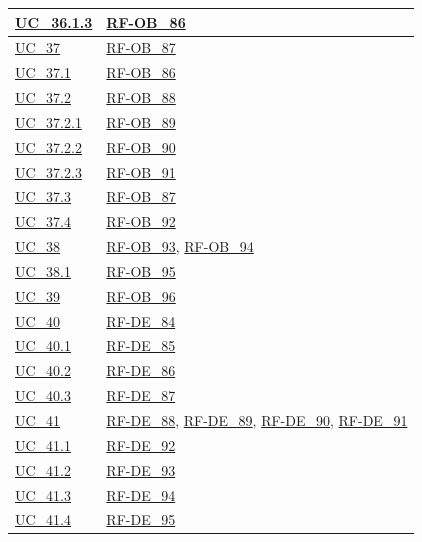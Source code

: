\begin{longtable}{|
        >{\raggedright\arraybackslash}p{} |
        >{\raggedright\arraybackslash}p{} |
    }
    \hline
    \hyperref[uc_36.1.3]{UC\_36.1.3} & \hyperlink{rf-ob_86}{RF-OB\_86} \\
    \hline
    \hyperref[uc_37]{UC\_37} & \hyperlink{rf-ob_87}{RF-OB\_87} \\
    \hline
    \hyperref[uc_37.1]{UC\_37.1} & \hyperlink{rf-ob_86}{RF-OB\_86} \\
    \hline
    \hyperref[uc_37.2]{UC\_37.2} & \hyperlink{rf-ob_88}{RF-OB\_88} \\
    \hline
    \hyperref[uc_37.2.1]{UC\_37.2.1} & \hyperlink{rf-ob_89}{RF-OB\_89} \\
    \hline
    \hyperref[uc_37.2.2]{UC\_37.2.2} & \hyperlink{rf-ob_90}{RF-OB\_90} \\
    \hline
    \hyperref[uc_37.2.3]{UC\_37.2.3} & \hyperlink{rf-ob_91}{RF-OB\_91} \\
    \hline
    \hyperref[uc_37.3]{UC\_37.3} & \hyperlink{rf-ob_87}{RF-OB\_87} \\
    \hline
    \hyperref[uc_37.4]{UC\_37.4} & \hyperlink{rf-ob_92}{RF-OB\_92} \\
    \hline
    \hyperref[uc_38]{UC\_38} & \hyperlink{rf-ob_93}{RF-OB\_93}, \hyperlink{rf-ob_94}{RF-OB\_94} \\
    \hline
    \hyperref[uc_38.1]{UC\_38.1} & \hyperlink{rf-ob_95}{RF-OB\_95} \\
    \hline
    \hyperref[uc_39]{UC\_39} & \hyperlink{rf-ob_96}{RF-OB\_96} \\
    \hline
    \hyperref[uc_40]{UC\_40} & \hyperlink{rf-de_84}{RF-DE\_84} \\
    \hline
    \hyperref[uc_40.1]{UC\_40.1} & \hyperlink{rf-de_85}{RF-DE\_85} \\
    \hline
    \hyperref[uc_40.2]{UC\_40.2} & \hyperlink{rf-de_86}{RF-DE\_86} \\
    \hline
    \hyperref[uc_40.3]{UC\_40.3} & \hyperlink{rf-de_87}{RF-DE\_87} \\
    \hline
    \hyperref[uc_41]{UC\_41} & \hyperlink{rf-de_88}{RF-DE\_88}, \hyperlink{rf-de_89}{RF-DE\_89}, \hyperlink{rf-de_90}{RF-DE\_90}, \hyperlink{rf-de_91}{RF-DE\_91} \\
    \hline
    \hyperref[uc_41.1]{UC\_41.1} & \hyperlink{rf-de_92}{RF-DE\_92} \\
    \hline
    \hyperref[uc_41.2]{UC\_41.2} & \hyperlink{rf-de_93}{RF-DE\_93} \\
    \hline
    \hyperref[uc_41.3]{UC\_41.3} & \hyperlink{rf-de_94}{RF-DE\_94} \\
    \hline
    \hyperref[uc_41.4]{UC\_41.4} & \hyperlink{rf-de_95}{RF-DE\_95} \\

\end{longtable}
